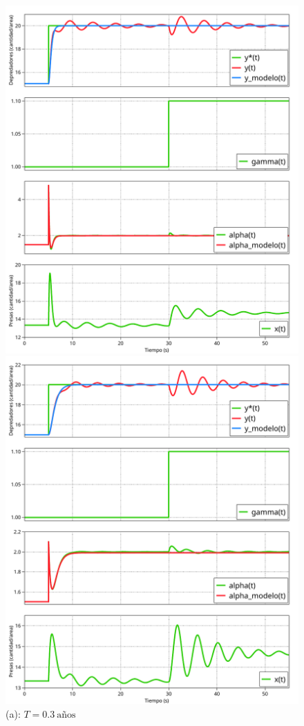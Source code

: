 \begin{figure}
    \centering
    \begin{minipage}{0.4\linewidth}
    \includegraphics[width=0.985\linewidth]{figs/t03.pdf}
    \caption*{(a): $T= \SI{0.3}{\text{años}}$}
    \end{minipage}
    \begin{minipage}{0.4\linewidth}
        \includegraphics[width=0.985\linewidth]{figs/t07.pdf}

\end{minipage}
\end{figure}
